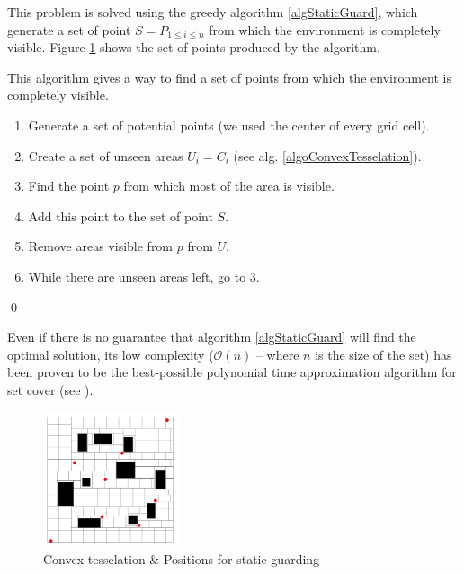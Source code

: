 This problem is solved using the greedy algorithm \ref{algStaticGuard}, which generate a set of point $ S = P_{1\leq i \leq n}$ from which the environment is completely visible. Figure \ref{convexTesselation} shows the set of points produced by the algorithm.

\begin{algorithm}
This algorithm gives a way to find a set of points from which the environment is completely visible.
\begin{enumerate}[topsep=1pt,itemsep=0ex,partopsep=1ex,parsep=1ex]
	\item Generate a set of potential points (we used the center of every grid cell).
	\item Create a set of unseen areas $U_i = C_i$ (see alg. \ref{algoConvexTesselation}).
	\item Find the point $p$ from which most of the area is visible.
	\item Add this point to the set of point $S$.
	\item Remove areas visible from $p$ from $U$.
	\item While there are unseen areas left, go to 3.
\end{enumerate}
\qed
\label{algStaticGuard}
\end{algorithm}

Even if there is no guarantee that algorithm \ref{algStaticGuard} will find the optimal solution, its low complexity ($\mathcal{O}(n)$ -- where $n$ is the size of the set) has been proven to be the best-possible polynomial time approximation algorithm for set cover (see \cite{approxMinProb}).

\begin{figure}[h!t]
	\begin{center}
	\includegraphics[width=150px]{fig/staticCoverSet.jpg}
	\end{center}
	\caption{Convex tesselation \& Positions for static guarding}
	\label{convexTesselation}
\end{figure}
